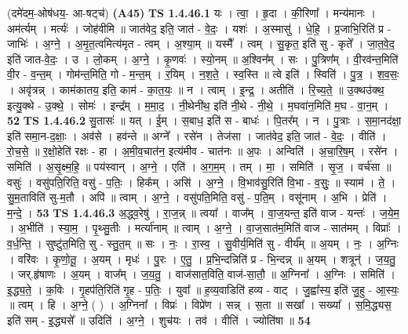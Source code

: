 \documentclass[17pt]{extarticle}
\begin{document}
                  \newline
                      (दमे॑दम॒-ओष॑धय॒- आ-षट्च॑)  \textbf{(A45)} \newline \newline
                                \textbf{ TS 1.4.46.1} \newline
                  यः । त्वा॒ । हृ॒दा । की॒रिणा᳚ । मन्य॑मानः । अम॑र्त्यम् । मर्त्यः॑ । जोह॑वीमि ॥ जात॑वेद॒ इति॒ जात॑ - वे॒दः॒ । यशः॑ । अ॒स्मासु॑ । धे॒हि॒ । प्र॒जाभि॒रिति॑ प्र - जाभिः॑ । अ॒ग्ने॒ । अ॒मृ॒त॒त्वमित्य॑मृत - त्वम् । अ॒श्या॒म् ॥ यस्मै᳚ । त्वम् । सु॒कृत॒ इति॑ सु - कृते᳚ । जा॒त॒वे॒द॒ इति॑ जात-वे॒दः॒ । उ । लो॒कम् । अ॒ग्ने॒ । कृ॒णवः॑ । स्यो॒नम् ॥ अ॒श्विन᳚म् । सः । पु॒त्रिण᳚म् । वी॒रव॑न्त॒मिति॑ वी॒र - व॒न्त॒म् । गोम॑न्त॒मिति॒ गो - म॒न्त॒म् । र॒यिम् । न॒श॒ते॒ । स्व॒स्ति ॥ त्वे इति॑ । स्विति॑ । पु॒त्र॒ । श॒व॒सः॒ । अवृ॑त्रन्न् । काम॑कातय॒ इति॒ काम॑ - का॒त॒यः॒ ॥ न । त्वाम् । इ॒न्द्र॒ । अतीति॑ । रि॒च्य॒ते॒ ॥ उ॒क्थ‌उ॑क्थ॒ इत्यु॒क्थे - उ॒क्थे॒ । सोमः॑ । इन्द्र᳚म् । म॒मा॒द॒ । नी॒थेनी॑थ॒ इति॑ नी॒थे - नी॒थे॒ । म॒घवा॑न॒मिति॑ म॒घ - वा॒न॒म् । \textbf{  52} \newline
                  \newline
                                \textbf{ TS 1.4.46.2} \newline
                  सु॒तासः॑ ॥ यत् । ई॒म् । स॒बाध॒ इति॑ स - बाधः॑ । पि॒तर᳚म् । न । पु॒त्राः । स॒मा॒नद॑क्षा॒ इति॑ समा॒न-द॒क्षाः॒ । अव॑से । हव॑न्ते ॥ अग्ने᳚ । रसे॑न । तेज॑सा । जात॑वेद॒ इति॒ जात॑ - वे॒दः॒ । वीति॑ । रो॒च॒से॒ ॥ र॒क्षो॒हेति॑ रक्षः - हा । अ॒मी॒व॒चात॑न॒ इत्य॑मीव - चात॑नः ॥ अ॒पः । अन्विति॑ । अ॒चा॒रि॒ष॒म् । रसे॑न । समिति॑ । अ॒सृ॒क्ष्म॒हि॒ ॥ पय॑स्वान् । अ॒ग्ने॒ । एति॑ । अ॒ग॒म॒म् । तम् । मा॒ । समिति॑ । सृ॒ज॒ । वर्च॑सा ॥ वसुः॑ । वसु॑पति॒रिति॒ वसु॑ - प॒तिः॒ । हिक᳚म् । असि॑ । अ॒ग्ने॒ । वि॒भाव॑सु॒रिति॑ वि॒भा - व॒सुः॒ ॥ स्याम॑ । ते॒ । सु॒म॒ताविति॑ सु-म॒तौ । अपि॑ ॥ त्वाम् । अ॒ग्ने॒ । वसु॑पति॒मिति॒ वसु॑ - प॒ति॒म् । वसू॑नाम् । अ॒भि । प्रेति॑ । म॒न्दे॒ । \textbf{  53} \newline
                  \newline
                                \textbf{ TS 1.4.46.3} \newline
                  अ॒द्ध्व॒रेषु॑ । रा॒ज॒न्न् ॥ त्वया᳚ । वाज᳚म् । वा॒ज॒यन्त॒ इति॑ वाज - यन्तः॑ । ज॒ये॒म॒ । अ॒भीति॑ । स्या॒म॒ । पृ॒थ्सु॒तीः । मर्त्या॑नाम् ॥ त्वाम् । अ॒ग्ने॒ । वा॒ज॒सात॑म॒मिति॑ वाज - सात॑मम् । विप्राः᳚ । व॒र्ध॒न्ति॒ । सुष्टु॑त॒मिति॒ सु - स्तु॒त॒म् ॥ सः । नः॒ । रा॒स्व॒ । सु॒वीर्य॒मिति॑ सु - वीर्य᳚म् ॥ अ॒यम् । नः॒ । अ॒ग्निः । वरि॑वः । कृ॒णो॒तू॒ । अ॒यम् । मृधः॑ । पु॒रः । ए॒तु॒ । प्र॒भि॒न्दन्निति॑ प्र - भि॒न्दन्न् ॥ अ॒यम् । शत्रून्॑ । ज॒य॒तु॒ । जर्.हृ॑षाणः । अ॒यम् । वाज᳚म् । ज॒य॒तु॒ । वाज॑सात॒विति॒ वाज॑-सा॒तौ॒ ॥ अ॒ग्निना᳚ । अ॒ग्निः । समिति॑ । इ॒द्ध्य॒ते॒ । क॒विः । गृ॒हप॑ति॒रिति॑ गृ॒ह - प॒तिः॒ । युवा᳚ ॥ ह॒व्य॒वाडिति॑ हव्य - वाट् । जु॒ह्वा᳚स्य॒ इति॑ जु॒हु - आ॒स्यः॒ ॥ त्वम् । हि । अ॒ग्ने॒ ( ) । अ॒ग्निना᳚ । विप्रः॑ । विप्रे॑ण । सन्न् । स॒ता ॥ सखा᳚ । सख्या᳚ । स॒मि॒द्ध्यस॒ इति॑ सम् - इ॒द्ध्यसे᳚ ॥ उदिति॑ । अ॒ग्ने॒ । शुच॑यः । तव॑ । वीति॑ । ज्योति॑षा ॥ \textbf{  54} \newline
\end{document}

